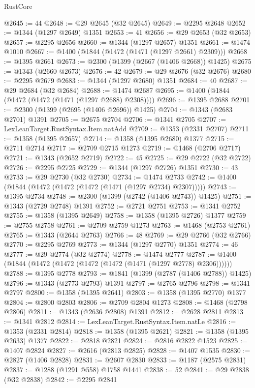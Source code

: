 \begin{lexlean}{RustCore}
\begin{coremodule}
@2645 := 44
@2648 := @29 @2645 (@32 @2645)
@2649 := @2295 @2648
@2652 := @1344 (@1297 @2649) @1351
@2653 := 41
@2656 := @29 @2653 (@32 @2653)
@2657 := @2295 @2656
@2660 := @1344 (@1297 @2657) @1351
@2661 := @1474 @1010
@2667 := @1400 (@1844 (@1472 (@1471 (@1297 @2661) @2309)))
@2668 := @1395 @2661
@2673 := @2300 (@1399 (@2667 (@1406 @2668)) @1425)
@2675 := @1343 (@2660 @2673)
@2676 := 42
@2679 := @29 @2676 (@32 @2676)
@2680 := @2295 @2679
@2683 := @1344 (@1297 @2680) @1351
@2684 := 40
@2687 := @29 @2684 (@32 @2684)
@2688 := @1474 @2687
@2695 := @1400 (@1844 (@1472 (@1472 (@1471 (@1297 @2688) @2308))))
@2696 := @1395 @2688
@2701 := @2300 (@1399 (@2695 (@1406 @2696)) @1425)
@2704 := @1343 (@2683 @2701) @1391
@2705 := @2675 @2704
@2706 := @1341 @2705
@2707 := LexLeanTarget.RustSyntax.Item.natAdd
@2709 := @1353 (@2331 @2707)
@2711 := @1358 (@1395 @2657)
@2714 := @1358 (@1395 @2680) @1377
@2715 := @2711 @2714
@2717 := @2709 @2715 @1273
@2719 := @1468 (@2706 @2717)
@2721 := @1343 (@2652 @2719)
@2722 := 45
@2725 := @29 @2722 (@32 @2722)
@2726 := @2295 @2725
@2729 := @1344 (@1297 @2726) @1351
@2730 := 43
@2733 := @29 @2730 (@32 @2730)
@2734 := @1474 @2733
@2742 := @1400 (@1844 (@1472 (@1472 (@1472 (@1471 (@1297 @2734) @2307)))))
@2743 := @1395 @2734
@2748 := @2300 (@1399 (@2742 (@1406 @2743)) @1425)
@2751 := @1343 (@2729 @2748) @1391
@2752 := @2721 @2751
@2753 := @1341 @2752
@2755 := @1358 (@1395 @2649)
@2758 := @1358 (@1395 @2726) @1377
@2759 := @2755 @2758
@2761 := @2709 @2759 @1273
@2763 := @1468 (@2753 @2761)
@2765 := @1343 (@2644 @2763)
@2766 := 48
@2769 := @29 @2766 (@32 @2766)
@2770 := @2295 @2769
@2773 := @1344 (@1297 @2770) @1351
@2774 := 46
@2777 := @29 @2774 (@32 @2774)
@2778 := @1474 @2777
@2787 := @1400 (@1844 (@1472 (@1472 (@1472 (@1472 (@1471 (@1297 @2778) @2306))))))
@2788 := @1395 @2778
@2793 := @1841 (@1399 (@2787 (@1406 @2788)) @1425)
@2796 := @1343 (@2773 @2793) @1391
@2797 := @2765 @2796
@2798 := @1341 @2797
@2800 := @1358 (@1395 @2641)
@2803 := @1358 (@1395 @2770) @1377
@2804 := @2800 @2803
@2806 := @2709 @2804 @1273
@2808 := @1468 (@2798 @2806)
@2811 := @1343 (@2636 @2808) @1391
@2812 := @2628 @2811
@2813 := @1341 @2812
@2814 := LexLeanTarget.RustSyntax.Item.natLe
@2816 := @1353 (@2331 @2814)
@2818 := @1358 (@1395 @2621)
@2821 := @1358 (@1395 @2633) @1377
@2822 := @2818 @2821
@2824 := @2816 @2822 @1523
@2825 := @1407 @2824
@2827 := @2616 (@2813 @2825)
@2828 := @1407 @1535
@2830 := @2827 (@1406 @2828)
@2831 := @2607 @2830
@2833 := @1187 (@2575 @2831)
@2837 := @1288 (@1291 @558) @1758 @1441
@2838 := 52
@2841 := @29 @2838 (@32 @2838)
@2842 := @2295 @2841

\end{coremodule}
\end{lexlean}

